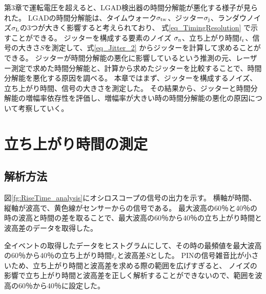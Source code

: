 第3章で運転電圧を超えると、LGAD検出器の時間分解能が悪化する様子が見られた。
LGADの時間分解能は、タイムウォーク$\sigma_{\rm{tw}}$、ジッター$\sigma_{\rm{j}}$、ランダウノイズ$\sigma_{\rm{L}}$の3つが大きく影響すると考えられており、
式\ref{eq_TimingResolution} で示すことができる。
ジッターを構成する要素のノイズ $\sigma_{\rm{n}}$、立ち上がり時間$t_{\rm{r}}$、信号の大きさ$S$を測定して、式\ref{eq_Jitter_2} からジッターを計算して求めることができる。
ジッターが時間分解能の悪化に影響しているという推測の元、レーザー測定で求めた時間分解能と、計算から求めたジッターを比較することで、時間分解能を悪化する原因を調べる。
本章ではまず、ジッターを構成するノイズ、立ち上がり時間、信号の大きさを測定した。
その結果から、ジッターと時間分解能の増幅率依存性を評価し、増幅率が大きい時の時間分解能の悪化の原因について考察していく。


\section{立ち上がり時間の測定}
\subsection{解析方法}
図\ref{fg:RiseTime_analysis}にオシロスコープの信号の出力を示す。
横軸が時間、縦軸が波高で、黄色線がセンサーからの信号である。
最大波高の60％と40％の時の波高と時間の差を取ることで、最大波高の60％から40％の立ち上がり時間と波高差のデータを取得した。


全イベントの取得したデータをヒストグラムにして、その時の最頻値を最大波高の60％から40％の立ち上がり時間$t_r$と波高差$S$とした。
PINの信号雑音比が小さいため、立ち上がり時間と波高差を求める際の範囲を広げすぎると、
ノイズの影響で立ち上がり時間と波高差を正しく解析することができないので、範囲を波高の60％から40％に設定した。


